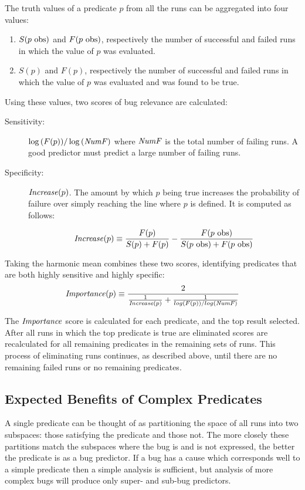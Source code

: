 The truth values of a predicate $p$ from all the runs can be aggregated into four values:

\begin{enumerate}
\item $S(\text{$p$ obs})$ and $F(\text{$p$ obs})$, respectively the number of successful and failed runs in which the value of $p$ was evaluated.
\item $S(p)$ and $F(p)$, respectively the number of successful and failed runs in which the value of $p$ was evaluated and was found to be true.
\end{enumerate}

Using these values, two scores of bug relevance are calculated:
\begin{description}
\item[Sensitivity:] $\log{(F(p))} / \log{(\mathit{NumF})}$ where $\mathit{NumF}$ is the total number of failing runs.  A good predictor must predict a large number of failing runs.
\item[Specificity:] $\mathit{Increase}(p)$.  The amount by which $p$ being true increases the probability of failure over simply reaching the line where $p$ is defined.  It is computed as follows:

  \begin{equation}
    \label{eqn1}
    \mathit{Increase}(p) \equiv
    \frac{F(p)}{S(p) + F(p)}
    -
    \frac{F(\text{$p$ obs})}{S(\text{$p$ obs}) + F(\text{$p$ obs})}
  \end{equation}

\end{description}

Taking the harmonic mean combines these two scores, identifying predicates that are both highly sensitive and highly specific:
\begin{equation}
\label{eqn2}
\Importance(p) \equiv
\frac{2}{%
  \frac{1}{\Increase(p)}
  +
  \frac{1}{log(F(p)) / log(\NumF)}}
\end{equation}

The $\mathit{Importance}$ score is calculated for each predicate, and the top result selected.  After all runs in which the top predicate is true are eliminated scores are recalculated for all remaining predicates in the remaining sets of runs.  This process of eliminating runs continues, as described above, until there are no remaining failed runs or no remaining predicates.

\subsection{Expected Benefits of Complex Predicates}
A single predicate can be thought of as partitioning the space of all runs into two subspaces: those satisfying the predicate and those not.  The more closely these partitions match the subspaces where the bug is and is not expressed, the better the predicate is as a bug predictor.  If a bug has a cause which corresponds well to a simple predicate then a simple analysis is sufficient, but analysis of more complex bugs will produce only super- and sub-bug predictors.

